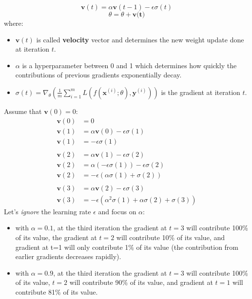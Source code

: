 \[\textbf{v}(t) = \alpha\textbf{v}(t - 1) - \epsilon\sigma(t)\]
\[\theta = \theta + \textbf{v(t)}\]
where:
\begin{itemize}
    \item $\textbf{v}(t)$ is called \textbf{velocity} vector and determines the new weight update done at iteration $t$.
    
    \item $\alpha$ is a hyperparameter between 0 and 1 which determines how quickly the contributions of previous gradients exponentially decay.

    \item $\sigma(t) = \nabla_\theta \left(\frac{1}{m}\sum_{i=1}^m L(f(\textbf{x}^{(i)}; \theta), \textbf{y}^{(i)})\right)$ is the gradient at iteration $t$.
\end{itemize}
Assume that $\textbf{v}(0) = 0$:
\begin{equation}
    \begin{split}
        \textbf{v}(0) & = 0 \\
        \textbf{v}(1) & = \alpha\textbf{v}(0) - \epsilon\sigma(1)\\
        \textbf{v}(1) & = -\epsilon\sigma(1) \\
        & \\
        \textbf{v}(2) & = \alpha\textbf{v}(1) - \epsilon\sigma(2)\\
        \textbf{v}(2) & = \alpha (-\epsilon\sigma(1)) -\epsilon\sigma(2)\\
        \textbf{v}(2) & = -\epsilon (\alpha\sigma(1) + \sigma(2))\\
        & \\
        \textbf{v}(3) & = \alpha\textbf{v}(2) - \epsilon\sigma(3)\\
        \textbf{v}(3) & = -\epsilon(\alpha^2\sigma(1) + \alpha\sigma(2) + \sigma(3))
    \end{split}
\end{equation}
Let's \textit{ignore} the learning rate $\epsilon$ and focus on $\alpha$:
\begin{itemize}
    \item with $\alpha = 0.1$, at the third iteration the gradient at $t = 3$ will contribute 100\% of its value, the gradient at $t=2$ will contribute 10\% of its value, and gradient at t=1 will only contribute 1\% of its value (the contribution from earlier gradients decreases rapidly).

    \item with $\alpha = 0.9$, at the third iteration the gradient at $t = 3$ will contribute 100\% of its value, $t=2$ will contribute 90\% of its value, and gradient at $t=1$ will contribute 81\% of its value.
\end{itemize}
